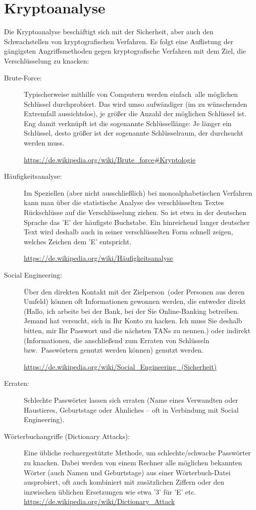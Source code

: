 \section{Kryptoanalyse}

Die Kryptoanalyse beschäftigt sich mit der Sicherheit, aber auch den
Schwachstellen von kryptografischen Verfahren. Es folgt eine Auflistung der
gängigsten Angriffsmethoden gegen kryptografische Verfahren mit dem Ziel, die
Verschlüsselung zu knacken:

\begin{description}
\item[Brute-Force:] Typischerweise mithilfe von Computern werden
\glqq einfach\grqq\ alle möglichen Schlüssel durchprobiert. Das wird umso
aufwändiger (im zu wünschenden Extremfall aussichtslos), je größer die Anzahl
der möglichen Schlüssel ist. Eng damit verknüpft ist die sogenannte
Schlüssellänge: Je länger ein Schlüssel, desto größer ist der sogenannte
\glqq Schlüsselraum\grqq , der durchsucht werden muss.

\url{https://de.wikipedia.org/wiki/Brute\_force\#Kryptologie} 

\item[Häufigkeitsanalyse:] Im Speziellen (aber nicht ausschließlich)
bei monoalphabetischen Verfahren kann man über die statistische Analyse des
verschlüsselten Textes Rückschlüsse auf die Verschlüsselung ziehen. So ist etwa
in der deutschen Sprache das 'E' der häufigste Buchstabe. Ein hinreichend
langer deutscher Text wird deshalb auch in seiner verschlüsselten Form schnell
zeigen, welches Zeichen dem 'E' entspricht.

\url{https://de.wikipedia.org/wiki/Häufigkeitsanalyse} 

\item[Social Engineering:] Über den direkten Kontakt mit der
\glqq Zielperson\grqq\ (oder Personen aus deren Umfeld) können oft Informationen
gewonnen werden, die entweder direkt (\glqq Hallo, ich arbeite bei der Bank, bei
der Sie Online-Banking betreiben. Jemand hat versucht, sich in Ihr Konto zu
hacken. Ich muss Sie deshalb bitten, mir Ihr Passwort und die nächsten TANs zu
nennen.\grqq ) oder indirekt (Informationen, die anschließend zum Erraten von
Schlüsseln bzw.\ Passwörtern genutzt werden können) genutzt werden.

\url{https://de.wikipedia.org/wiki/Social\_Engineering\_(Sicherheit)} 

\item[Erraten:] Schlechte Passwörter lassen sich erraten (Name eines
Verwandten oder Haustieres, Geburtstage oder Ähnliches -- oft in Verbindung mit
\glqq Social Engineering\grqq ).

\item[Wörterbuchangriffe (Dictionary Attacks):] Eine übliche
rechnergestützte Methode, um schlechte/schwache Passwörter zu knacken. Dabei
werden von einem Rechner alle möglichen bekannten Wörter (auch Namen und
Geburtstage) aus einer Wörterbuch-Datei ausprobiert, oft auch kombiniert mit zusätzlichen
Ziffern oder den inzwischen üblichen Ersetzungen wie etwa '3' für 'E' etc.
\url{https://de.wikipedia.org/wiki/Dictionary_Attack} 
\end{description}